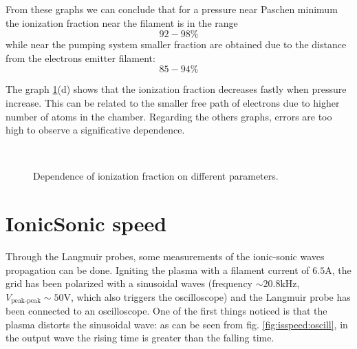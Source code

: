 \documentclass[11pt,a4 paper]{article}
\begin{document}
From these graphs we can conclude that for a pressure near Paschen minimum the ionization fraction near the filament is in the range
\[92-98\%\]
while near the pumping system smaller fraction are obtained due to the distance from the electrons emitter filament:
\[85-94\%\]

The graph \ref{fig:f}(d) shows that the ionization fraction decreases fastly when pressure increase. This can be related to the smaller free path of electrons due to higher number of atoms in the chamber. Regarding the others graphs, errors are too high to observe a significative dependence.
%
\begin{figure}[H]
\\%
 \caption{Dependence of ionization fraction on different parameters.}\label{fig:f}%
\end{figure}

\section{IonicSonic speed}
Through the Langmuir probes, some measurements of the ionic-sonic waves propagation can be done. Igniting the plasma with a filament current of $6.5\si{\ampere}$, the grid has been polarized with a sinusoidal waves (frequency $\sim20.8\si{\kilo\hertz}$, $V_\text{peak-peak}\sim50\si{\volt}$, which also triggers the oscilloscope) and the Langmuir probe has been connected to an oscilloscope. One of the first things noticed is that the plasma distorts the sinusoidal wave: as can be seen from fig. \ref{fig:isspeed:oscill}, in the output wave the rising time is greater than the falling time.
\end{document}
